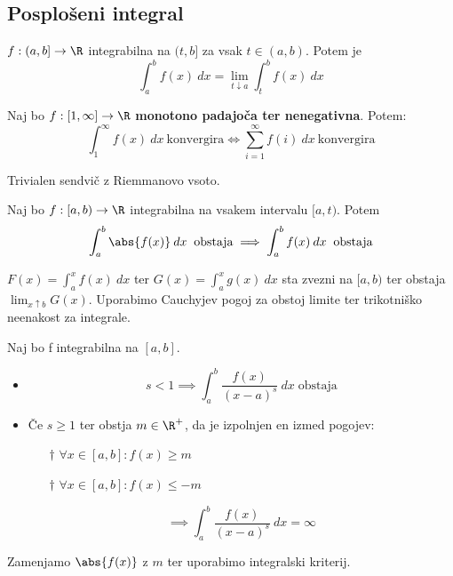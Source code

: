 \documentclass[12pt, a4paper, unicode]{article}
\begin{document}
\subsection{Posplošeni integral}
\begin{definicija}
$f:(a,b] \to \R$ integrabilna na $(t,b]$ za vsak $t \in (a,b)$. Potem je $$\int_{a}^{b} f(x) \: dx= \lim_{t \downarrow a} \int_{t}^{b}f(x) \: dx$$
\end{definicija}

\begin{izrek}
Naj bo $f:[1, \infty] \to \R$ \textbf{monotono padajoča ter nenegativna}. Potem:
$$\int_{1}^{\infty} f(x) \: dx \: \text{konvergira} \iff \sum_{i=1}^{\infty} f(i) \: dx \: \text{konvergira}$$
\end{izrek}
\begin{oris}
Trivialen sendvič z Riemmanovo vsoto.
\end{oris}

\begin{izrek}
Naj bo $f:[a,b) \to \R$ integrabilna na vsakem intervalu $[a,t)$. Potem $$\int_{a}^{b}\abs{f(x)} \: dx \; \; \text{obstaja} \implies \int_{a}^{b}f(x) \: dx \; \; \text{obstaja}$$
\end{izrek}
\begin{oris}
$F(x) = \int_{a}^{x} f(x) \: dx$ ter $G(x) = \int_{a}^{x} g(x) \: dx$ sta zvezni na $[a,b)$ ter obstaja $\lim_{x \uparrow b}G(x)$. Uporabimo Cauchyjev pogoj za obstoj limite ter trikotniško neenakost za integrale.
\end{oris}

\begin{izrek}
Naj bo f integrabilna na $[a,b].$
\begin{itemize}
    \item $$s < 1 \implies \int_{a}^{b} \frac{f(x)}{(x-a)^s} \: dx \; \text{obstaja}$$
    \item Če $s \geq 1$ ter obstja $m \in \R^{+}$, da je izpolnjen en izmed pogojev:
        \begin{itemize}
            \item[$\dagger$] $\forall x \in [a,b]: f(x) \geq m$
            \item[$\dagger$] $\forall x \in [a,b]: f(x) \leq -m$
        \end{itemize}
        $$\implies \int_{a}^{b} \frac{f(x)}{(x-a)^s} \: dx = \infty$$
\end{itemize}
\end{izrek} 
\begin{oris}
Zamenjamo $\abs{f(x)}$ z $m$ ter uporabimo integralski kriterij.
\end{oris}
\end{document}
